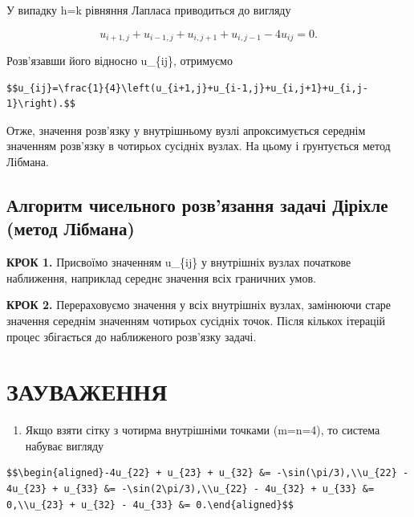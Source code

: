 \documentclass[
  ukrainian,
]{article}
\providecommand{\tightlist}{%
  \setlength{\itemsep}{0pt}\setlength{\parskip}{0pt}}
\begin{document}
У випадку h=k рівняння Лапласа приводиться до вигляду

\[u_{i+1,j}+u_{i-1,j}+u_{i,j+1}+u_{i,j-1}-4u_{ij}=0.\]

Розв'язавши його відносно u\_\{ij\}, отримуємо

\begin{verbatim}
$$u_{ij}=\frac{1}{4}\left(u_{i+1,j}+u_{i-1,j}+u_{i,j+1}+u_{i,j-1}\right).$$
\end{verbatim}

Отже, значення розв'язку у внутрішньому вузлі апроксимується середнім
значенням розв'язку в чотирьох сусідніх вузлах. На цьому і ґрунтується
метод Лібмана.

\subsection{Алгоритм чисельного розв'язання задачі Діріхле (метод
Лібмана)}\label{ux430ux43bux433ux43eux440ux438ux442ux43c-ux447ux438ux441ux435ux43bux44cux43dux43eux433ux43e-ux440ux43eux437ux432ux44fux437ux430ux43dux43dux44f-ux437ux430ux434ux430ux447ux456-ux434ux456ux440ux456ux445ux43bux435-ux43cux435ux442ux43eux434-ux43bux456ux431ux43cux430ux43dux430}

\textbf{КРОК 1.} Присвоїмо значенням u\_\{ij\} у внутрішніх вузлах
початкове наближення, наприклад середнє значення всіх граничних умов.

\textbf{КРОК 2.} Перераховуємо значення у всіх внутрішніх вузлах,
замінюючи старе значення середнім значенням чотирьох сусідніх точок.
Після кількох ітерацій процес збігається до наближеного розв'язку
задачі.

\section{ЗАУВАЖЕННЯ}\label{ux437ux430ux443ux432ux430ux436ux435ux43dux43dux44f-13}

\begin{enumerate}
\def\labelenumi{\arabic{enumi}.}
\tightlist
\item
  Якщо взяти сітку з чотирма внутрішніми точками (m=n=4), то система
  набуває вигляду
\end{enumerate}

\begin{verbatim}
$$\begin{aligned}-4u_{22} + u_{23} + u_{32} &= -\sin(\pi/3),\\u_{22} - 4u_{23} + u_{33} &= -\sin(2\pi/3),\\u_{22} - 4u_{32} + u_{33} &= 0,\\u_{23} + u_{32} - 4u_{33} &= 0.\end{aligned}$$
\end{verbatim}
\end{document}
